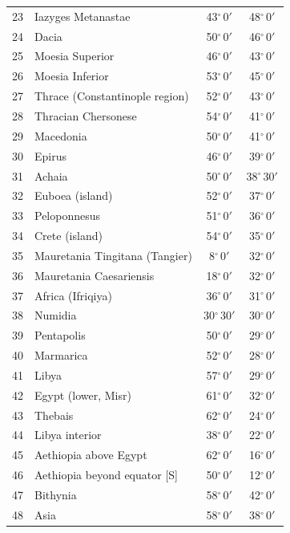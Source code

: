 \documentclass[10pt,a4paper]{article}
\begin{document}
\begin{longtable}{r >{\raggedright\arraybackslash}p{8.5cm} c c}
23 & Iazyges Metanastae & 43$^\circ$\,0$'$ & 48$^\circ$\,0$'$\\
24 & Dacia & 50$^\circ$\,0$'$ & 46$^\circ$\,0$'$\\
25 & Moesia Superior & 46$^\circ$\,0$'$ & 43$^\circ$\,0$'$\\
26 & Moesia Inferior & 53$^\circ$\,0$'$ & 45$^\circ$\,0$'$\\
27 & Thrace (Constantinople region) & 52$^\circ$\,0$'$ & 43$^\circ$\,0$'$\\
28 & Thracian Chersonese & 54$^\circ$\,0$'$ & 41$^\circ$\,0$'$\\
29 & Macedonia & 50$^\circ$\,0$'$ & 41$^\circ$\,0$'$\\
30 & Epirus & 46$^\circ$\,0$'$ & 39$^\circ$\,0$'$\\
31 & Achaia & 50$^\circ$\,0$'$ & 38$^\circ$\,30$'$\\
32 & Euboea (island) & 52$^\circ$\,0$'$ & 37$^\circ$\,0$'$\\
33 & Peloponnesus & 51$^\circ$\,0$'$ & 36$^\circ$\,0$'$\\
34 & Crete (island) & 54$^\circ$\,0$'$ & 35$^\circ$\,0$'$\\
35 & Mauretania Tingitana (Tangier) & 8$^\circ$\,0$'$ & 32$^\circ$\,0$'$\\
36 & Mauretania Caesariensis & 18$^\circ$\,0$'$ & 32$^\circ$\,0$'$\\
37 & Africa (Ifriqiya) & 36$^\circ$\,0$'$ & 31$^\circ$\,0$'$\\
38 & Numidia & 30$^\circ$\,30$'$ & 30$^\circ$\,0$'$\\
39 & Pentapolis & 50$^\circ$\,0$'$ & 29$^\circ$\,0$'$\\
40 & Marmarica & 52$^\circ$\,0$'$ & 28$^\circ$\,0$'$\\
41 & Libya & 57$^\circ$\,0$'$ & 29$^\circ$\,0$'$\\
42 & Egypt (lower, Misr) & 61$^\circ$\,0$'$ & 32$^\circ$\,0$'$\\
43 & Thebais & 62$^\circ$\,0$'$ & 24$^\circ$\,0$'$\\
44 & Libya interior & 38$^\circ$\,0$'$ & 22$^\circ$\,0$'$\\
45 & Aethiopia above Egypt & 62$^\circ$\,0$'$ & 16$^\circ$\,0$'$\\
46 & Aethiopia beyond equator {[}S{]} & 50$^\circ$\,0$'$ & 12$^\circ$\,0$'$\\
47 & Bithynia & 58$^\circ$\,0$'$ & 42$^\circ$\,0$'$\\
48 & Asia & 58$^\circ$\,0$'$ & 38$^\circ$\,0$'$\\

\end{longtable}
\end{document}
